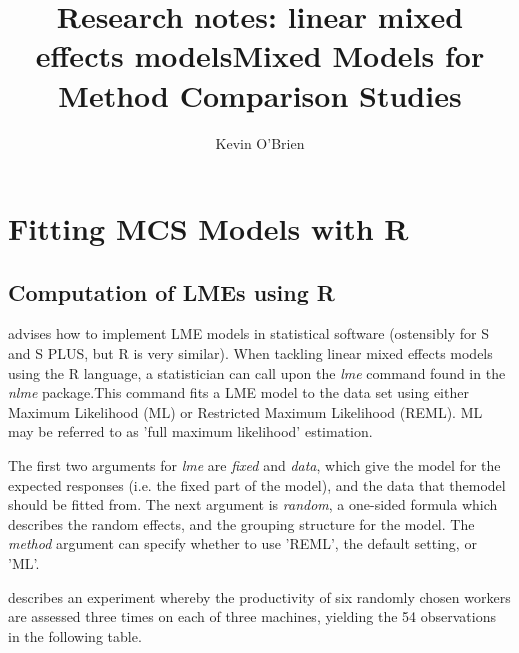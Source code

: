 \documentclass[12pt, a4paper]{report}
\title{Research notes: linear mixed effects models}
\author{ } \date{ }
\theoremstyle{plain}
\theoremstyle{definition}
\theoremstyle{remark}
\begin{document}
	\author{Kevin O'Brien}
	\title{Mixed Models for Method Comparison Studies}
	\tableofcontents
	
	\chapter{Fitting MCS Models with R}
\section{Computation of LMEs using R} \cite{PB} advises how to
implement LME models in statistical software (ostensibly for S and
S PLUS, but R is very similar). When tackling linear mixed effects
models using the R language, a statistician can call upon the
\emph{lme} command found in the \emph{nlme} package.This command
fits a LME model to the data set using either Maximum Likelihood
(ML) or Restricted Maximum Likelihood (REML). ML may be referred
to as 'full maximum likelihood' estimation.

The first two arguments for \emph{lme} are \emph{fixed} and
\emph{data}, which give the model for the expected responses (i.e.
the fixed part of the model), and the data that themodel should be
fitted from. The next argument is  \emph{random}, a one-sided
formula which describes the random effects, and the grouping
structure for the model. The  \emph{method} argument can specify
whether to use 'REML', the default setting, or 'ML'.

\citet{PB} describes an experiment whereby the productivity of six
randomly chosen workers are assessed three times on each of three
machines, yielding the 54 observations in the following table.
\end{document}
